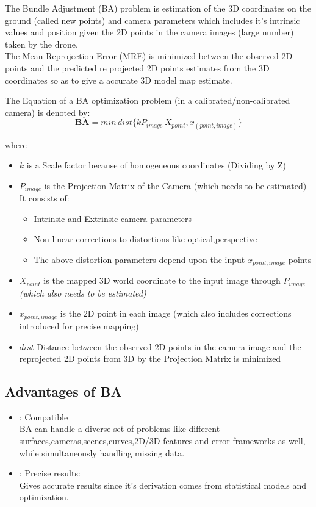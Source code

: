 \documentclass{article}[11pt]
\begin{document}
The Bundle Adjustment (BA) problem is estimation of the 3D coordinates on the ground (called new points) and camera parameters which includes it's intrinsic values and position given the 2D points in the camera images (large number) taken by the drone.
\\ The Mean Reprojection Error (MRE) is minimized between the observed 2D points and the predicted re projected 2D points estimates from the 3D coordinates so as to give a accurate 3D model map estimate.

The Equation of a BA optimization problem (in a calibrated/non-calibrated camera) is denoted by:
\begin{equation}
\label{eq1}
    \textbf{BA} = min \, dist\{k P_{image} \, X_{point}, x_{(point,image)}\}
\end{equation}{}

where
\begin{itemize}
    \item $k$ is a Scale factor because of homogeneous coordinates (Dividing by Z) 
    \item $P_{image}$ is the Projection Matrix of the Camera {(which needs to be estimated)}
    \\ It consists of:
    \begin{itemize}
        \item Intrinsic and Extrinsic camera parameters 
        \item Non-linear corrections to distortions like optical,perspective
        \item The above distortion parameters depend upon the input $x_{point,image}$ points
    \end{itemize}
    \item $X_{point}$ is the mapped 3D world coordinate to the input image through $P_{image}$ \emph{(which also needs to be estimated)}
    \item $x_{point,image}$ is the 2D point in each image (which also includes corrections introduced for precise mapping)
    \item $dist$ Distance between the observed 2D points in the camera image and the reprojected 2D points from 3D by the Projection Matrix is minimized 
    
\end{itemize}

\subsection{Advantages of BA}
\begin{itemize}
    \item : Compatible
    \\BA can handle a diverse set of problems like different surfaces,cameras,scenes,curves,2D/3D features and error frameworks as well, while simultaneously handling missing data.
    \item: Precise results:
    \\ Gives accurate results since it's derivation comes from statistical models and optimization.
\end{itemize}
\end{document}

